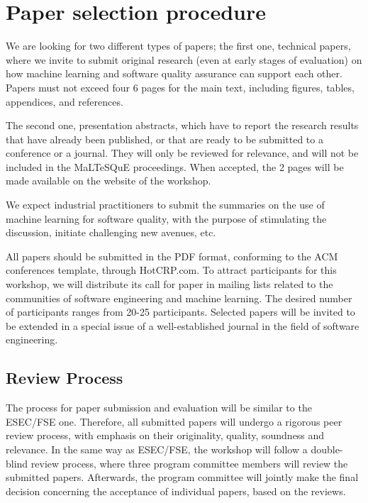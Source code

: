 \section{Paper selection procedure}
\label{sec:submissions}

We are looking for two different types of papers; the first one, \ie technical papers, where we invite to submit original research (even at early stages of evaluation) on how machine learning and software quality assurance can support each other.
Papers must not exceed four 6 pages for the main text, including figures, tables, appendices, and references.

The second one, \ie presentation abstracts, which have to report the research results that have already been published, or that are ready to be submitted to a conference or a journal.
They will only be reviewed for relevance, and will not be included in the MaLTeSQuE proceedings.
When accepted, the 2 pages will be made available on the website of the workshop.

We expect industrial practitioners to submit the summaries on the use of machine learning for software quality, with the purpose of stimulating the discussion, initiate challenging new avenues, etc.

All papers should be submitted in the PDF format, conforming to the ACM conferences template, through HotCRP.com.
To attract participants for this workshop, we will distribute its call for paper in mailing lists related to the communities of software engineering and machine learning.
The desired number of participants ranges from 20-25 participants.
Selected papers will be invited to be extended in a special issue of a well-established journal in the field of software engineering.

\subsection{Review Process}
The process for paper submission and evaluation will be similar to the ESEC/FSE one.
Therefore, all submitted papers will undergo a rigorous peer review process, with emphasis on their originality, quality, soundness and relevance.
In the same way as ESEC/FSE, the workshop will follow a double-blind review process, where three program committee members will review the submitted papers.
Afterwards, the program committee will jointly make the final decision concerning the acceptance of individual papers, based on the reviews.

